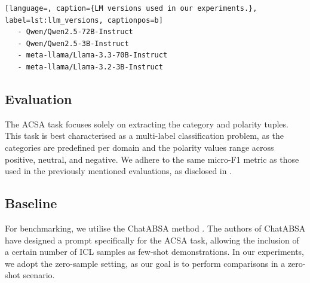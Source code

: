 \documentclass[11pt]{article}
\begin{document}
{\small
\begin{lstlisting}[language=, caption={LM versions used in our experiments.}, label=lst:llm_versions, captionpos=b]
   - Qwen/Qwen2.5-72B-Instruct
   - Qwen/Qwen2.5-3B-Instruct
   - meta-llama/Llama-3.3-70B-Instruct
   - meta-llama/Llama-3.2-3B-Instruct
\end{lstlisting}
}

\subsection{Evaluation}

The ACSA task focuses solely on extracting the category and polarity tuples. This task is best characterised as a multi-label classification problem, as the categories are predefined per domain and the polarity values range across positive, neutral, and negative. We adhere to the same micro-F1 metric as those used in the previously mentioned evaluations, as disclosed in \citet{cai-etal-2020-aspect}.


\subsection{Baseline}
For benchmarking, we utilise the ChatABSA method \citep{bai-etal-2024-compound}. The authors of ChatABSA have designed a prompt specifically for the ACSA task, allowing the inclusion of a certain number of ICL samples as few-shot demonstrations. In our experiments, we adopt the zero-sample setting, as our goal is to perform comparisons in a zero-shot scenario.



\end{document}
